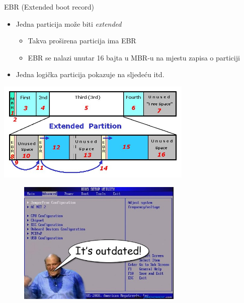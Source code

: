 \documentclass[croatian,t]{beamer} %
\begin{document}
	\begin{frame}{EBR (Extended boot record)}
		\begin{itemize}
            \item Jedna particija može biti \emph{extended}
            \begin{itemize}
            	\item Takva proširena particija ima EBR
            	\item EBR se nalazi unutar 16 bajta u MBR-u na mjestu zapisa o particiji
            \end{itemize}
            \item Jedna logička particija pokazuje na sljedeću itd.
		\end{itemize}
		\begin{center}
			\includegraphics[width=0.7\textwidth]{../pics/EBRreality.jpg}		
		\end{center}
	\end{frame}

    \begin{frame}
		\begin{figure}
			\includegraphics[width=0.7\textwidth]{../pics/bios-outdated-uefi.jpg}
		\end{figure}
    \end{frame}  
	
\end{document}

